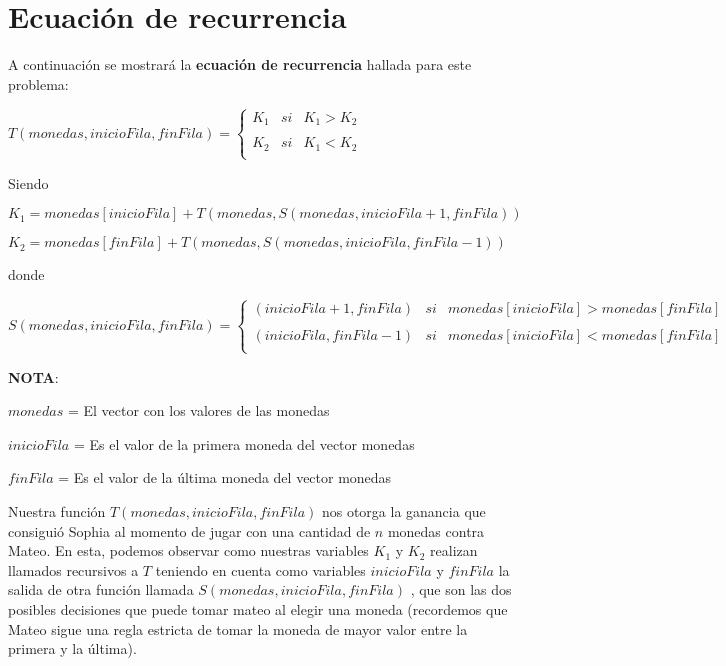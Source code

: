 \section{Ecuación de recurrencia}

A continuación se mostrará la \textbf{ecuación de recurrencia} hallada para este
problema:

\vskip0.5cm

\begin{center}
  
    $T(monedas, inicioFila, finFila) = \left\{ \begin{array}{lcc} K_{1} & si & K_{1} > K_{2} \\ \\ K_{2} & si & K_{1} < K_{2} \\  \end{array} \right.$

\end{center}

Siendo 

\vskip0.25cm

\begin{center}
  
    $K_{1} = monedas[inicioFila] + T(monedas, S(monedas, inicioFila + 1, finFila))$

    \vskip0.1cm
    $K_{2} = monedas[finFila] + T(monedas, S(monedas, inicioFila, finFila - 1))$
\end{center}


donde


$S(monedas, inicioFila, finFila) = \left\{ \begin{array}{lcc} (inicioFila+1,finFila) & si & monedas[inicioFila] > monedas[finFila] \\ \\ (inicioFila, finFila - 1) & si &  monedas[inicioFila] < monedas[finFila] \\  \end{array} \right.$

\vskip0.5cm

\textbf{NOTA}: 

$monedas$ = El vector con los valores de las monedas

$inicioFila$ = Es el valor de la primera moneda del vector monedas

$finFila$ = Es el valor de la última moneda del vector monedas

\vskip0.5cm

Nuestra función $T(monedas, inicioFila, finFila)$ nos otorga la ganancia que consiguió Sophia al momento de jugar con una cantidad de $n$ monedas contra Mateo. En esta, podemos observar como nuestras variables $K_{1}$ y $K_{2}$
realizan llamados recursivos a $T$ teniendo en cuenta como variables $inicioFila$ y $finFila$ la salida de otra función llamada $S(monedas, inicioFila, finFila)$ , que son las dos posibles decisiones que puede tomar mateo al elegir una moneda (recordemos que Mateo sigue una regla estricta de tomar la moneda de mayor valor entre la primera y la última).